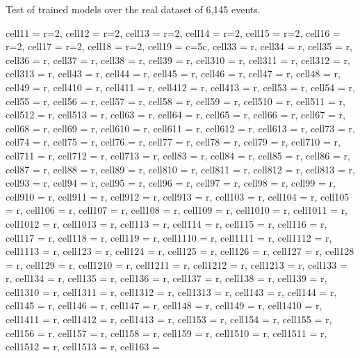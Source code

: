 \documentclass[journal]{IEEEtran}
\begin{document}
\begin{table}
\caption{Test of trained models over the real dataset of 6,145 events.}
\centering
\begin{adjustbox}{width=\textwidth}
\begin{tblr}{
  cell{1}{1} = {r=2}{},  cell{1}{2} = {r=2}{},  cell{1}{3} = {r=2}{},  cell{1}{4} = {r=2}{},  cell{1}{5} = {r=2}{},  cell{1}{6} = {r=2}{},  cell{1}{7} = {r=2}{},  cell{1}{8} = {r=2}{},  cell{1}{9} = {c=5}{c},  cell{3}{3} = {r},  cell{3}{4} = {r},  cell{3}{5} = {r},  cell{3}{6} = {r},  cell{3}{7} = {r},  cell{3}{8} = {r},  cell{3}{9} = {r},  cell{3}{10} = {r},  cell{3}{11} = {r},  cell{3}{12} = {r},  cell{3}{13} = {r},  cell{4}{3} = {r},  cell{4}{4} = {r},  cell{4}{5} = {r},  cell{4}{6} = {r},  cell{4}{7} = {r},  cell{4}{8} = {r},  cell{4}{9} = {r},  cell{4}{10} = {r},  cell{4}{11} = {r},  cell{4}{12} = {r},  cell{4}{13} = {r},  cell{5}{3} = {r},  cell{5}{4} = {r},  cell{5}{5} = {r},  cell{5}{6} = {r},  cell{5}{7} = {r},  cell{5}{8} = {r},  cell{5}{9} = {r},  cell{5}{10} = {r},  cell{5}{11} = {r},  cell{5}{12} = {r},  cell{5}{13} = {r},  cell{6}{3} = {r},  cell{6}{4} = {r},  cell{6}{5} = {r},  cell{6}{6} = {r},  cell{6}{7} = {r},  cell{6}{8} = {r},  cell{6}{9} = {r},  cell{6}{10} = {r},  cell{6}{11} = {r},  cell{6}{12} = {r},  cell{6}{13} = {r},  cell{7}{3} = {r},  cell{7}{4} = {r},  cell{7}{5} = {r},  cell{7}{6} = {r},  cell{7}{7} = {r},  cell{7}{8} = {r},  cell{7}{9} = {r},  cell{7}{10} = {r},  cell{7}{11} = {r},  cell{7}{12} = {r},  cell{7}{13} = {r},  cell{8}{3} = {r},  cell{8}{4} = {r},  cell{8}{5} = {r},  cell{8}{6} = {r},  cell{8}{7} = {r},  cell{8}{8} = {r},  cell{8}{9} = {r},  cell{8}{10} = {r},  cell{8}{11} = {r},  cell{8}{12} = {r},  cell{8}{13} = {r},  cell{9}{3} = {r},  cell{9}{4} = {r},  cell{9}{5} = {r},  cell{9}{6} = {r},  cell{9}{7} = {r},  cell{9}{8} = {r},  cell{9}{9} = {r},  cell{9}{10} = {r},  cell{9}{11} = {r},  cell{9}{12} = {r},  cell{9}{13} = {r},  cell{10}{3} = {r},  cell{10}{4} = {r},  cell{10}{5} = {r},  cell{10}{6} = {r},  cell{10}{7} = {r},  cell{10}{8} = {r},  cell{10}{9} = {r},  cell{10}{10} = {r},  cell{10}{11} = {r},  cell{10}{12} = {r},  cell{10}{13} = {r},  cell{11}{3} = {r},  cell{11}{4} = {r},  cell{11}{5} = {r},  cell{11}{6} = {r},  cell{11}{7} = {r},  cell{11}{8} = {r},  cell{11}{9} = {r},  cell{11}{10} = {r},  cell{11}{11} = {r},  cell{11}{12} = {r},  cell{11}{13} = {r},  cell{12}{3} = {r},  cell{12}{4} = {r},  cell{12}{5} = {r},  cell{12}{6} = {r},  cell{12}{7} = {r},  cell{12}{8} = {r},  cell{12}{9} = {r},  cell{12}{10} = {r},  cell{12}{11} = {r},  cell{12}{12} = {r},  cell{12}{13} = {r},  cell{13}{3} = {r},  cell{13}{4} = {r},  cell{13}{5} = {r},  cell{13}{6} = {r},  cell{13}{7} = {r},  cell{13}{8} = {r},  cell{13}{9} = {r},  cell{13}{10} = {r},  cell{13}{11} = {r},  cell{13}{12} = {r},  cell{13}{13} = {r},  cell{14}{3} = {r},  cell{14}{4} = {r},  cell{14}{5} = {r},  cell{14}{6} = {r},  cell{14}{7} = {r},  cell{14}{8} = {r},  cell{14}{9} = {r},  cell{14}{10} = {r},  cell{14}{11} = {r},  cell{14}{12} = {r},  cell{14}{13} = {r},  cell{15}{3} = {r},  cell{15}{4} = {r},  cell{15}{5} = {r},  cell{15}{6} = {r},  cell{15}{7} = {r},  cell{15}{8} = {r},  cell{15}{9} = {r},  cell{15}{10} = {r},  cell{15}{11} = {r},  cell{15}{12} = {r},  cell{15}{13} = {r},  cell{16}{3} = }
\end{tblr}
\end{adjustbox}
\end{table}
\end{document}
